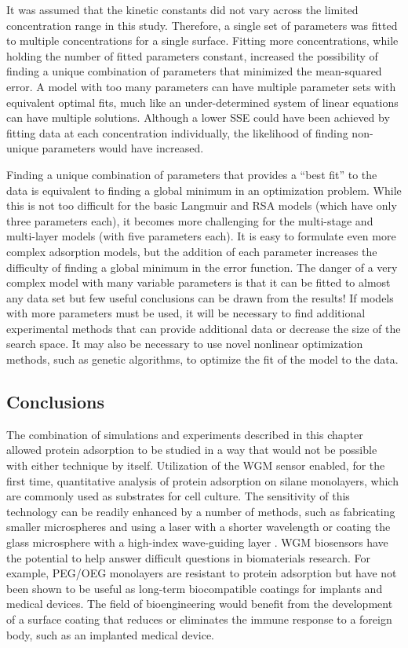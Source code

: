 It was assumed that the kinetic constants did not vary across the
limited concentration range in this study. Therefore, a single set
of parameters was fitted to multiple concentrations for a single surface.
Fitting more concentrations, while holding the number of fitted parameters
constant, increased the possibility of finding a unique combination
of parameters that minimized the mean-squared error. A model with
too many parameters can have multiple parameter sets with equivalent
optimal fits, much like an under-determined system of linear equations
can have multiple solutions. Although a lower SSE could have been
achieved by fitting data at each concentration individually, the likelihood
of finding non-unique parameters would have increased.

Finding a unique combination of parameters that provides a {}``best
fit'' to the data is equivalent to finding a global minimum in an
optimization problem. While this is not too difficult for the basic
Langmuir and RSA models (which have only three parameters each), it
becomes more challenging for the multi-stage and multi-layer models
(with five parameters each). It is easy to formulate even more complex
adsorption models, but the addition of each parameter increases the
difficulty of finding a global minimum in the error function. The
danger of a very complex model with many variable parameters is that
it can be fitted to almost any data set but few useful conclusions
can be drawn from the results! If models with more parameters must
be used, it will be necessary to find additional experimental methods
that can provide additional data or decrease the size of the search
space. It may also be necessary to use novel nonlinear optimization
methods, such as genetic algorithms, to optimize the fit of the model
to the data.


\subsection{Conclusions}

The combination of simulations and experiments described in this chapter
allowed protein adsorption to be studied in a way that would not be
possible with either technique by itself. Utilization of the WGM sensor
enabled, for the first time, quantitative analysis of protein adsorption
on silane monolayers, which are commonly used as substrates for cell
culture. The sensitivity of this technology can be readily enhanced
by a number of methods, such as fabricating smaller microspheres and
using a laser with a shorter wavelength \cite{Vollmer2008a} or coating
the glass microsphere with a high-index wave-guiding layer \cite{Teraoka2006}.
WGM biosensors have the potential to help answer difficult questions
in biomaterials research. For example, PEG/OEG monolayers are resistant
to protein adsorption but have not been shown to be useful as long-term
biocompatible coatings for implants and medical devices. The field
of bioengineering would benefit from the development of a surface
coating that reduces or eliminates the immune response to a foreign
body, such as an implanted medical device.

